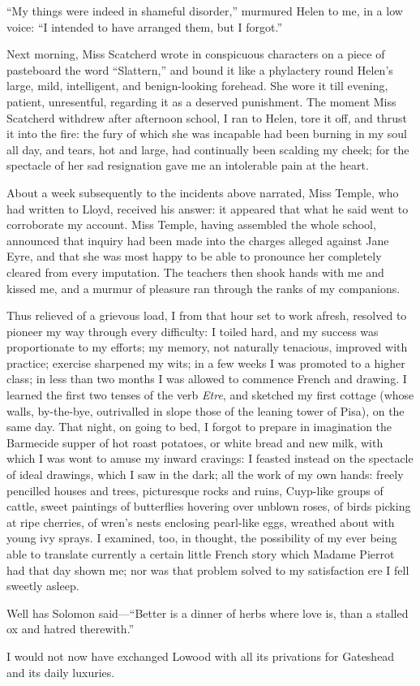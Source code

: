 \enquote{My things were indeed in shameful disorder,} murmured Helen to
me, in a low voice: \enquote{I intended to have arranged them, but I
	forgot.}

Next morning, Miss Scatcherd wrote in conspicuous characters on a piece
of pasteboard the word \enquote{Slattern,} and bound it like a
phylactery round Helen's large, mild, intelligent, and benign-looking
forehead. She wore it till evening, patient, unresentful, regarding it
as a deserved punishment. The moment Miss Scatcherd withdrew after
afternoon school, I ran to Helen, tore it off, and thrust it into the
fire: the fury of which she was incapable had been burning in my soul
all day, and tears, hot and large, had continually been scalding my
cheek; for the spectacle of her sad resignation gave me an intolerable
pain at the heart.

About a week subsequently to the incidents above narrated, Miss Temple,
who had written to \Mr{} Lloyd, received his answer: it appeared that what
he said went to corroborate my account. Miss Temple, having assembled
the whole school, announced that inquiry had been made into the charges
alleged against Jane Eyre, and that she was most happy to be able to
pronounce her completely cleared from every imputation. The teachers
then shook hands with me and kissed me, and a murmur of pleasure ran
through the ranks of my companions.

Thus relieved of a grievous load, I from that hour set to work afresh,
resolved to pioneer my way through every difficulty: I toiled hard, and
my success was proportionate to my efforts; my memory, not naturally
tenacious, improved with practice; exercise sharpened my wits; in a few
weeks I was promoted to a higher class; in less than two months I was
allowed to commence French and drawing. I learned the first two tenses
of the verb \emph{Etre}, and sketched my first cottage (whose walls,
by-the-bye, outrivalled in slope those of the leaning tower of Pisa), on
the same day. That night, on going to bed, I forgot to prepare in
imagination the Barmecide supper of hot roast potatoes, or white bread
and new milk, with which I was wont to amuse my inward cravings: I
feasted instead on the spectacle of ideal drawings, which I saw in the
dark; all the work of my own hands: freely pencilled houses and trees,
picturesque rocks and ruins, Cuyp-like groups of cattle, sweet paintings
of butterflies hovering over unblown roses, of birds picking at ripe
cherries, of wren's nests enclosing pearl-like eggs, wreathed about with
young ivy sprays. I examined, too, in thought, the possibility of my
ever being able to translate currently a certain little French story
which Madame Pierrot had that day shown me; nor was that problem solved
to my satisfaction ere I fell sweetly asleep.

Well has Solomon said---\enquote{Better is a dinner of herbs where love
	is, than a stalled ox and hatred therewith.}

I would not now have exchanged Lowood with all its privations for
Gateshead and its daily luxuries.
